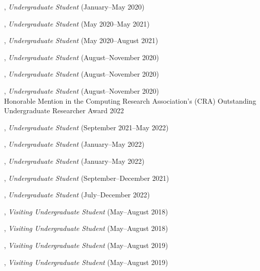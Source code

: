 \documentclass[10pt]{article}
\newenvironment{myindentpar}[1]%
{\begin{list}{}%
         {\setlength{\leftmargin}{#1}}%
         \item[]%
}
{\end{list}}
\newcounter{list}
\begin{document}
\begin{myindentpar}{0.75cm}
\hspace{-0.75cm}{\bf Luke Marushack}, \textit{Undergraduate Student} (January--May 2020)

\hspace{-0.75cm}{\bf Michael Lee}, \textit{Undergraduate Student} (May 2020--May 2021)

\hspace{-0.75cm}{\bf Ms. Ann Hermann}, \textit{Undergraduate Student} (May 2020--August 2021)

\hspace{-0.75cm}{\bf Joseph Kuebler}, \textit{Undergraduate Student} (August--November 2020)

\hspace{-0.75cm}{\bf Facundo Munoz}, \textit{Undergraduate Student} (August--November 2020)

\hspace{-0.75cm}{\bf Fangcong Yin}, \textit{Undergraduate Student} (August--November 2020) \\
	Honorable Mention in the Computing Research Association's (CRA) Outstanding Undergraduate Researcher Award 2022

\hspace{-0.75cm}{\bf Jackson Ballow}, \textit{Undergraduate Student} (September 2021--May 2022)

\hspace{-0.75cm}{\bf Ryan Pairitz}, \textit{Undergraduate Student} (January--May 2022)

\hspace{-0.75cm}{\bf Kekoa Wang}, \textit{Undergraduate Student} (January--May 2022)

\hspace{-0.75cm}{\bf Ms. Longqing Chen}, \textit{Undergraduate Student} (September--December 2021)

\hspace{-0.75cm}{\bf William Porter}, \textit{Undergraduate Student} (July--December 2022)

\hspace{-0.75cm}{\bf Wenhao Yu}, \textit{Visiting Undergraduate Student} (May--August 2018)

\hspace{-0.75cm}{\bf Ms. Yu Shu}, \textit{Visiting Undergraduate Student} (May--August 2018)

\hspace{-0.75cm}{\bf Chuchen Deng}, \textit{Visiting Undergraduate Student} (May--August 2019)

\hspace{-0.75cm}{\bf Yihong Ma}, \textit{Visiting Undergraduate Student} (May--August 2019)


\end{myindentpar}
\end{document}
